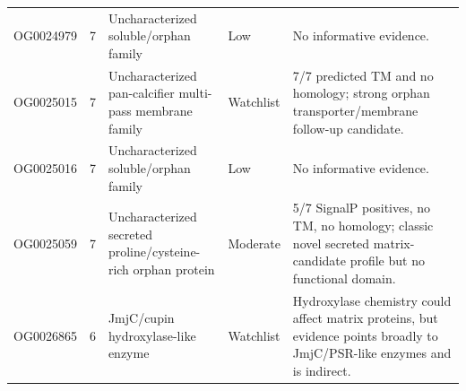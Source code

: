 \begin{longtable}{p{1.9cm}r p{4.55cm}p{1.8cm}p{5.55cm}}
OG0024979 & 7 & Uncharacterized soluble/orphan family & Low & No informative evidence.\\
OG0025015 & 7 & Uncharacterized pan-calcifier multi-pass membrane family & Watchlist & 7/7 predicted TM and no homology; strong orphan transporter/membrane follow-up candidate.\\
OG0025016 & 7 & Uncharacterized soluble/orphan family & Low & No informative evidence.\\
OG0025059 & 7 & Uncharacterized secreted proline/cysteine-rich orphan protein & Moderate & 5/7 SignalP positives, no TM, no homology; classic novel secreted matrix-candidate profile but no functional domain.\\
OG0026865 & 6 & JmjC/cupin hydroxylase-like enzyme & Watchlist & Hydroxylase chemistry could affect matrix proteins, but evidence points broadly to JmjC/PSR-like enzymes and is indirect.\\
\end{longtable}
\endgroup

